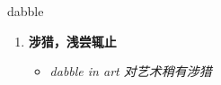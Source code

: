 
\begin{frame}
{\huge dabble}
\begin{center}
\begin{enumerate}\Large
  \item \textbf{涉猎，浅尝辄止}
  \begin{itemize}
    \item \em{\Large{dabble in art 对艺术稍有涉猎}}
  \end{itemize}
\end{enumerate}
\end{center}
\end{frame}
